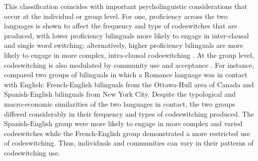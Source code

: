\documentclass[output=paper,colorlinks,citecolor=brown]{langscibook}
\begin{document}
This classification coincides with important psycholinguistic considerations that occur at the individual or group level. For one, proficiency across the two languages is shown to affect the frequency and type of codeswitches that are produced, with lower proficiency bilinguals more likely to engage in inter-clausal and single word switching; alternatively, higher proficiency bilinguals are more likely to engage in more complex, intra-clausal codeswitching \citep{Miccioetal2009,Poplack1980}. At the group level, codeswitching is also modulated by community use and acceptance \citep{ParafitaCoutoetal2023}. For instance, \citet{Poplack1987} compared two groups of bilinguals in which a Romance language was in contact with English: French-English bilinguals from the Ottawa-Hull area of Canada and Spanish-English bilinguals from New York City. Despite the typological and macro-economic similarities of the two languages in contact, the two groups differed considerably in their frequency and types of codeswitching produced. The Spanish-English group were more likely to engage in more complex and varied codeswitches while the French-English group demonstrated a more restricted use of codeswitching. Thus, individuals and communities can vary in their patterns of codeswitching use.
\end{document}
